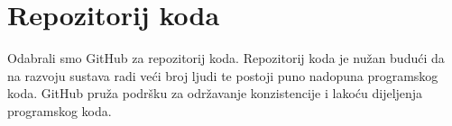 \documentclass[times, utf8, seminar, numeric]{fer}
\begin{document}
\section{Repozitorij koda} 
Odabrali smo GitHub za repozitorij koda. Repozitorij koda je nužan budući da na razvoju sustava radi veći broj ljudi te postoji puno nadopuna programskog koda. GitHub pruža podršku za održavanje konzistencije i lakoću dijeljenja programskog koda. 



%
%

\end{document}
